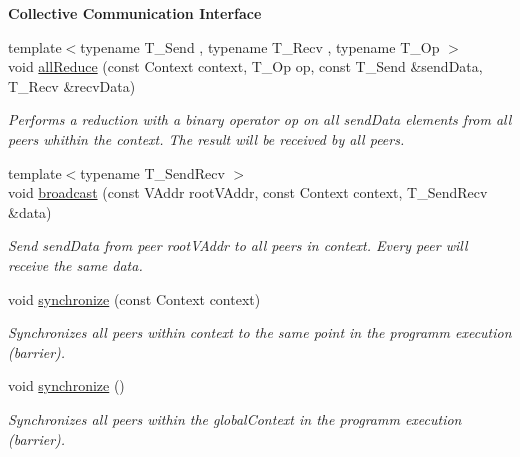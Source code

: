 \begin{Indent}{\bf Collective Communication Interface}
\begin{DoxyCompactItemize}
{\footnotesize template$<$typename T\+\_\+\+Send , typename T\+\_\+\+Recv , typename T\+\_\+\+Op $>$ }\\void \hyperlink{structgraybat_1_1communicationPolicy_1_1BMPI_aed0dd7f1c36157182cf0d0545879a6b8}{all\+Reduce} (const Context context, T\+\_\+\+Op op, const T\+\_\+\+Send \&send\+Data, T\+\_\+\+Recv \&recv\+Data)
\begin{DoxyCompactList}\small\item\em Performs a reduction with a binary operator {\itshape op} on all {\itshape send\+Data} elements from all peers whithin the {\itshape context}. The result will be received by all peers. \end{DoxyCompactList}\item 
{\footnotesize template$<$typename T\+\_\+\+Send\+Recv $>$ }\\void \hyperlink{structgraybat_1_1communicationPolicy_1_1BMPI_ad21dca81db3bd46870062ef978f00206}{broadcast} (const V\+Addr root\+V\+Addr, const Context context, T\+\_\+\+Send\+Recv \&data)
\begin{DoxyCompactList}\small\item\em Send {\itshape send\+Data} from peer {\itshape root\+V\+Addr} to all peers in {\itshape context}. Every peer will receive the same data. \end{DoxyCompactList}\item 
\hypertarget{structgraybat_1_1communicationPolicy_1_1BMPI_aa99355d8aae18e14c59b82c4ab4e2c29}{}void \hyperlink{structgraybat_1_1communicationPolicy_1_1BMPI_aa99355d8aae18e14c59b82c4ab4e2c29}{synchronize} (const Context context)\label{structgraybat_1_1communicationPolicy_1_1BMPI_aa99355d8aae18e14c59b82c4ab4e2c29}

\begin{DoxyCompactList}\small\item\em Synchronizes all peers within {\itshape context} to the same point in the programm execution (barrier). \end{DoxyCompactList}\item 
void \hyperlink{structgraybat_1_1communicationPolicy_1_1BMPI_ae2cb4b8fa14af3cd34fc4dd8c3af6baa}{synchronize} ()
\begin{DoxyCompactList}\small\item\em Synchronizes all peers within the global\+Context in the programm execution (barrier). \end{DoxyCompactList}\end{DoxyCompactItemize}
\end{Indent}
